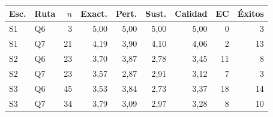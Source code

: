 \begin{tabular}{llrrrrrrr}
\hline
Esc. & Ruta & $n$ & Exact. & Pert. & Sust. & Calidad & EC & Éxitos \\
\hline
S1 & Q6 & 3 & 5{,}00 & 5{,}00 & 5{,}00 & 5{,}00 & 0 & 3 \\
S1 & Q7 & 21 & 4{,}19 & 3{,}90 & 4{,}10 & 4{,}06 & 2 & 13 \\
S2 & Q6 & 23 & 3{,}70 & 3{,}87 & 2{,}78 & 3{,}45 & 11 & 8 \\
S2 & Q7 & 23 & 3{,}57 & 2{,}87 & 2{,}91 & 3{,}12 & 7 & 3 \\
S3 & Q6 & 45 & 3{,}53 & 3{,}84 & 2{,}73 & 3{,}37 & 18 & 14 \\
S3 & Q7 & 34 & 3{,}79 & 3{,}09 & 2{,}97 & 3{,}28 & 8 & 10 \\
\hline
\end{tabular}

